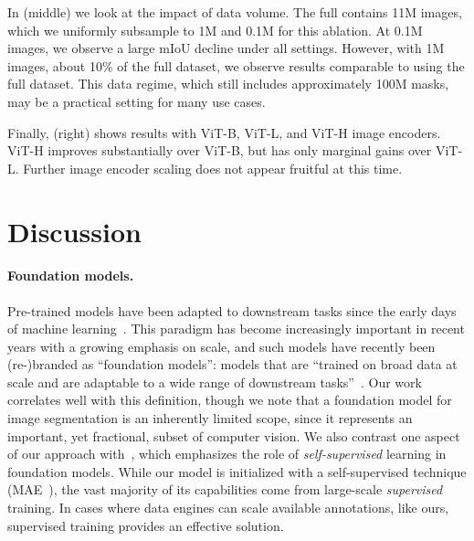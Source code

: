 In  (middle) we look at the impact of data volume. The full \sad contains 11M images, which we uniformly subsample to 1M and 0.1M for this ablation. At 0.1M images, we observe a large mIoU decline under all settings. However, with 1M images, about 10\% of the full dataset, we observe results comparable to using the full dataset. This data regime, which still includes approximately 100M masks, may be a practical setting for many use cases.

Finally,  (right) shows results with ViT-B, ViT-L, and ViT-H image encoders. ViT-H improves substantially over ViT-B, but has only marginal gains over ViT-L. Further image encoder scaling does not appear fruitful at this time.

\section{Discussion}\label{sec:disc}\vspace{-1mm}

\paragraph{Foundation models.} Pre-trained models have been adapted to downstream tasks since the early days of machine learning~\cite{thrun1995learning}. This paradigm has become increasingly important in recent years with a growing emphasis on scale, and such models have recently been (re-)branded as ``foundation models'': \ie models that are ``trained on broad data at scale and are adaptable to a wide range of downstream tasks''~\cite{bommasani2021opportunities}. Our work correlates well with this definition, though we note that a foundation model for image segmentation is an inherently limited scope, since it represents an important, yet fractional, subset of computer vision. We also contrast one aspect of our approach with~\cite{bommasani2021opportunities}, which emphasizes the role of \emph{self-supervised} learning in foundation models. While our model is initialized with a self-supervised technique (MAE~\cite{he2022masked}), the vast majority of its capabilities come from large-scale \emph{supervised} training. In cases where data engines can scale available annotations, like ours, supervised training provides an effective solution.

